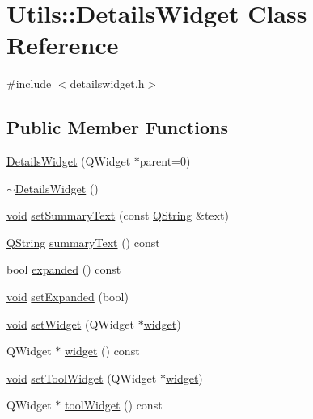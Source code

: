 \hypertarget{class_utils_1_1_details_widget}{\section{\-Utils\-:\-:\-Details\-Widget \-Class \-Reference}
\label{class_utils_1_1_details_widget}
}


{\ttfamily \#include $<$detailswidget.\-h$>$}

\subsection*{\-Public \-Member \-Functions}
\begin{DoxyCompactItemize}
\item 
\hyperlink{class_utils_1_1_details_widget_aa0ae292ed3fc5a82ee55fffb79eaa6ff}{\-Details\-Widget} (\-Q\-Widget $\ast$parent=0)
\item 
\hyperlink{class_utils_1_1_details_widget_a9a875b874501f81639c8401f9cf9057e}{$\sim$\-Details\-Widget} ()
\item 
\hyperlink{group___u_a_v_objects_plugin_ga444cf2ff3f0ecbe028adce838d373f5c}{void} \hyperlink{class_utils_1_1_details_widget_a1aa501fbf4e176597700a73aa5f8cd11}{set\-Summary\-Text} (const \hyperlink{group___u_a_v_objects_plugin_gab9d252f49c333c94a72f97ce3105a32d}{\-Q\-String} \&text)
\item 
\hyperlink{group___u_a_v_objects_plugin_gab9d252f49c333c94a72f97ce3105a32d}{\-Q\-String} \hyperlink{class_utils_1_1_details_widget_a239341cec0b796a1f5b57addfea8425d}{summary\-Text} () const 
\item 
bool \hyperlink{class_utils_1_1_details_widget_a128f49aacab86017c0b856ce7178d0c9}{expanded} () const 
\item 
\hyperlink{group___u_a_v_objects_plugin_ga444cf2ff3f0ecbe028adce838d373f5c}{void} \hyperlink{class_utils_1_1_details_widget_a71bb50697df68e40ea56ee57f6277e13}{set\-Expanded} (bool)
\item 
\hyperlink{group___u_a_v_objects_plugin_ga444cf2ff3f0ecbe028adce838d373f5c}{void} \hyperlink{class_utils_1_1_details_widget_ae744ea85a5de470f73f5185addcb5faa}{set\-Widget} (\-Q\-Widget $\ast$\hyperlink{class_utils_1_1_details_widget_a9950386de7995df703fd0b1059838579}{widget})
\item 
\-Q\-Widget $\ast$ \hyperlink{class_utils_1_1_details_widget_a9950386de7995df703fd0b1059838579}{widget} () const 
\item 
\hyperlink{group___u_a_v_objects_plugin_ga444cf2ff3f0ecbe028adce838d373f5c}{void} \hyperlink{class_utils_1_1_details_widget_a9294d5fbf7dafdf46c0af597b5643b36}{set\-Tool\-Widget} (\-Q\-Widget $\ast$\hyperlink{class_utils_1_1_details_widget_a9950386de7995df703fd0b1059838579}{widget})
\item 
\-Q\-Widget $\ast$ \hyperlink{class_utils_1_1_details_widget_a4e95bb9f73ff8f16bd89f34eeb5197ab}{tool\-Widget} () const 
\end{DoxyCompactItemize}
